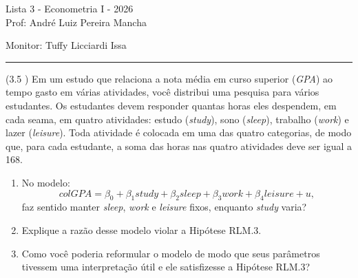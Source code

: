 \documentclass[12pt,letterpaper, onecolumn]{exam}
\begin{document}
\begingroup  
    \centering
    \LARGE Lista 3 - Econometria I - 2026\\[0.5em]
    \large Prof: André Luiz Pereira Mancha \par
    \large Monitor: Tuffy Licciardi Issa  \par
\endgroup
\rule{\textwidth}{0.4pt}
\pointsdroppedatright   %
\printanswers
\renewcommand{\solutiontitle}{\noindent\textbf{Ans:}\enspace}   %


\begin{questions}

    \question (3.5 \citep{wooldridge2016}) Em um estudo que relaciona a nota média em curso superior (\textit{GPA}) ao tempo gasto em várias atividades, você distribui uma pesquisa para vários estudantes. Os estudantes devem responder quantas horas eles despendem, em cada seama, em quatro atividades: estudo (\textit{study}), sono (\textit{sleep}), trabalho (\textit{work}) e lazer (\textit{leisure}). Toda atividade é colocada em uma das quatro categorias, de modo que, para cada estudante, a soma das horas nas quatro atividades deve ser igual a 168.
    \begin{enumerate}[label=(\alph*)]
    \item No modelo:\begin{equation*}
        colGPA = \beta_0 + \beta_1study +\beta_2sleep + \beta_3work + \beta_4 leisure + u,
    \end{equation*} faz sentido manter \textit{sleep}, \textit{work} e \textit{leisure} fixos, enquanto \textit{study} varia?
    \item Explique a razão desse modelo violar a Hipótese RLM.3.
    \item Como você poderia reformular o modelo de modo que seus parâmetros tivessem uma interpretação útil e ele satisfizesse a Hipótese RLM.3?
    \end{enumerate}
\
\



\end{questions}
\end{document}
